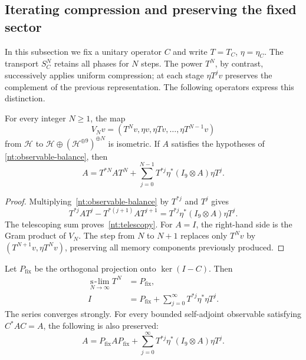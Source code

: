 \subsection{Iterating compression and preserving the fixed sector}

In this subsection we fix a unitary operator \(C\) and write
\(T=T_C\), \(\eta=\eta_C\). The transport \(S_C^N\) retains all
phases for \(N\) steps. The power \(T^N\), by contrast,
successively applies uniform compression; at each stage
\(\eta T^jv\) preserves the complement of the previous representation.
The following operators express this distinction.

\begin{proposition}
For every integer \(N\geq1\), the map
\begin{equation}
 V_Nv=(T^Nv,\eta v,\eta Tv,\ldots,\eta T^{N-1}v)
 \label{nt:finite-record}
\end{equation}
from \(\mathcal H\) to
\(\mathcal H\oplus(\mathcal H^{\oplus9})^{\oplus N}\)
is isometric. If \(A\) satisfies the hypotheses of
\eqref{nt:observable-balance}, then
\begin{equation}
 A=T^{*N}AT^N+
 \sum_{j=0}^{N-1}T^{*j}\eta^*(I_9\otimes A)\eta T^j.
 \label{nt:telescopy}
\end{equation}
\end{proposition}

\begin{proof}
Multiplying~\eqref{nt:observable-balance} by \(T^{*j}\) and
\(T^j\) gives
\[
 T^{*j}AT^j-T^{*(j+1)}AT^{j+1}
 =T^{*j}\eta^*(I_9\otimes A)\eta T^j.
\]
The telescoping sum proves~\eqref{nt:telescopy}. For \(A=I\),
the right-hand side is the Gram product of \(V_N\).
The step from \(N\) to \(N+1\) replaces only \(T^Nv\) by
\((T^{N+1}v,\eta T^Nv)\), preserving all memory
components previously produced.
\end{proof}

\begin{theorem}
Let \(P_{\mathrm{fix}}\) be the orthogonal projection onto
\(\ker(I-C)\). Then
\begin{align}
 \operatorname*{s\!-\!lim}_{N\to\infty}T^N
   &=P_{\mathrm{fix}},\label{nt:strong-limit}\\
 I&=P_{\mathrm{fix}}+
 \sum_{j=0}^{\infty}T^{*j}\eta^*\eta T^j.\label{nt:infinite-record}
\end{align}
The series converges strongly. For every bounded self-adjoint
observable satisfying \(C^*AC=A\), the following is also preserved:
\begin{equation}
 A=P_{\mathrm{fix}}AP_{\mathrm{fix}}+
 \sum_{j=0}^{\infty}
 T^{*j}\eta^*(I_9\otimes A)\eta T^j.
 \label{nt:infinite-observable}
\end{equation}
\end{theorem}

